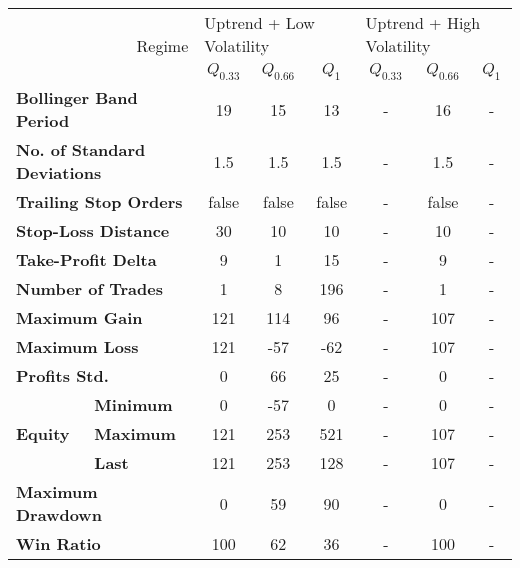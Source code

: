 \centering
\begin{tabular}{ll|cccccc}
    \toprule
    \multicolumn{2}{r|}{\multirow{2}{*}{Regime}} & \multicolumn{3}{l}{Uptrend + Low Volatility}     & \multicolumn{3}{l}{Uptrend + High Volatility}     \\
    \multicolumn{2}{r|}{} & $Q_{0.33}$ & $Q_{0.66}$ & $Q_{1}$ & $Q_{0.33}$ & $Q_{0.66}$ & $Q_{1}$ \\
    \midrule
    \multicolumn{2}{l|}{\textbf{Bollinger Band Period}} & 19 & 15 & 13 & - & 16 & - \\
    \multicolumn{2}{l|}{\textbf{No. of Standard Deviations}} & 1.5 & 1.5 & 1.5 & - & 1.5 & - \\
    \multicolumn{2}{l|}{\textbf{Trailing Stop Orders}} & false & false & false & - & false & - \\
    \multicolumn{2}{l|}{\textbf{Stop-Loss Distance}} & 30 & 10 & 10 & - & 10 & - \\
    \multicolumn{2}{l|}{\textbf{Take-Profit Delta}} & 9 & 1 & 15 & - & 9 & - \\
    \midrule
    \multicolumn{2}{l|}{\textbf{Number of Trades}} & 1 & 8 & 196 & - & 1 & - \\
    \multicolumn{2}{l|}{\textbf{Maximum Gain}} & 121 & 114 & 96 & - & 107 & - \\
    \multicolumn{2}{l|}{\textbf{Maximum Loss}} & 121 & -57 & -62 & - & 107 & - \\
    \multicolumn{2}{l|}{\textbf{Profits Std.}} & 0 & 66 & 25 & - & 0 & - \\
    \multirow{3}{*}{\textbf{Equity}} & \textbf{Minimum} & 0   & -57 & 0   & - & 0   & - \\
    & \textbf{Maximum} & 121 & 253 & 521 & - & 107 & - \\
    & \textbf{Last}    & 121 & 253 & 128 & - & 107 & - \\
    \multicolumn{2}{l|}{\textbf{Maximum Drawdown}} & 0 & 59 & 90 & - & 0 & - \\
    \multicolumn{2}{l|}{\textbf{Win Ratio}} & 100 & 62 & 36 & - & 100 & - \\
    \bottomrule
\end{tabular}